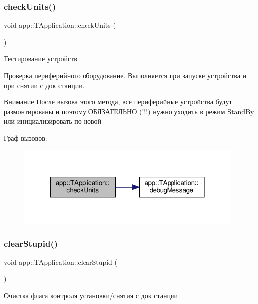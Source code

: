 \subsubsection{\texorpdfstring{check\+Units()}{checkUnits()}}
{\footnotesize\ttfamily void app\+::\+T\+Application\+::check\+Units (\begin{DoxyParamCaption}{ }\end{DoxyParamCaption})}



Тестирование устройств 

Проверка периферийного оборудование. Выполняется при запуске устройства и при снятии с док станции. \begin{DoxyAttention}{Внимание}
После вызова этого метода, все периферийные устройства будут размонтированы и поэтому ОБЯЗАТЕЛЬНО (!!!) нужно уходить в режим Stand\+By или инициализировать по новой 
\end{DoxyAttention}
Граф вызовов\+:\nopagebreak
\begin{figure}[H]
\begin{center}
\leavevmode
\includegraphics[width=312pt]{classapp_1_1_t_application_acf71a4fe338cbc1e771cc9a60431c3bf_cgraph}
\end{center}
\end{figure}
\mbox{\label{classapp_1_1_t_application_aaa44a223c18f6087f10eb9bae637b90c}} 
\subsubsection{\texorpdfstring{clear\+Stupid()}{clearStupid()}}
{\footnotesize\ttfamily void app\+::\+T\+Application\+::clear\+Stupid (\begin{DoxyParamCaption}{ }\end{DoxyParamCaption})}



Очистка флага контроля установки/снятия с док станции 



